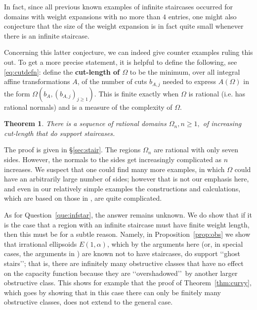 \documentclass[11pt, reqno]{amsart}
\newtheorem{thm}{Theorem}[subsection]
\theoremstyle{remark}
\numberwithin{equation}{subsection}
\numberwithin{figure}{section}
\theoremstyle{customremark}
\newcommand{\al}{{\alpha}}
\newcommand{\Om}{{\Omega}}
\newcommand{\MS}{{\medskip}}
\begin{document}
In fact, since all previous known examples of infinite staircases occurred for domains with weight expansions with no more than $4$
entries,  one might also conjecture that the size of the weight expansion is in fact quite small whenever there is an infinite staircase.

Concerning this latter conjecture, we can indeed give counter examples ruling this out.   
To get a more precise statement, it is helpful to define the following, see \eqref{eq:cutdefn}: define 
the {\bf cut-length of $\Om$} to be the minimum, over all integral affine transformations $A$, of the
number  of cuts $b_{A,j}$ needed to express $A(\Om)$ in the form
$ \Om(b_A, (b_{A,j})_{j\ge 1})$. This is finite exactly when  $\Om$ is rational (i.e. has rational normals) and is a measure of 
 the complexity of $\Om$.

\begin{thm}\label{thm:inftystair}
There is a sequence of rational domains $\Om_n, n\ge 1,$ of increasing cut-length that do support staircases.
\end{thm}


The proof is given in \S\ref{sec:stair}.  
The regions $\Om_n$ are rational with only seven sides. However, the normals to the sides get increasingly complicated as $n$ increases.  We suspect that one could find many more examples, in which $\Om$ could have an arbitrarily large number of sides; however that is not our emphasis here, and even in our relatively simple examples the constructions and calculations, which are based on those in \cite{MM,MMW}, are quite complicated. 


 As for Question~\ref{que:infstar}, the answer remains unknown.  We do show that if it is the case that a region with an infinite staircase must have finite weight length, then this must be for a subtle reason.  Namely, 
 in 
 Proposition~\ref{prop:obs} we show that irrational ellipsoids $E(1,\al)$, which by 
 the arguments here (or, in special cases, the arguments in \cite{salinger})
 are known not to have staircases, 
 do support 
 \lq\lq ghost stairs\rq\rq;  that is, there are  infinitely many obstructive classes  that have no effect on the capacity function because they are \lq\lq overshadowed\rq\rq\, by another larger obstructive class. 
 This shows for example that the proof of Theorem~\ref{thm:curvy}, which goes by showing that in this case there can only be finitely many obstructive classes, does not extend to the general  case.
 
\end{document}
